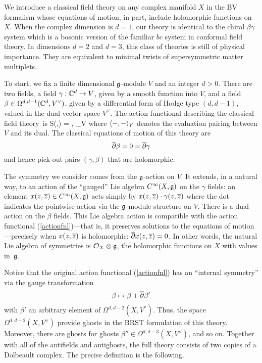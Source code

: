 We introduce a classical field theory on any complex manifold $X$ in the BV formalism whose equations of motion, in part, include holomorphic functions on $X$.
When the complex dimension is $d = 1$, our theory is identical to the chiral $\beta\gamma$ system which is a bosonic version of the familiar $bc$ system in conformal field theory. 
In dimensions $d=2$ and $d=3$, this class of theories is still of physical importance.
They are equivalent to minimal twists of supersymmetric matter multiplets. 

To start, we fix a finite dimensional $\mathfrak g$-module $V$ and an integer $d > 0$.
There are two fields, a field $\gamma : \mathbb C^d \to V$, given by a smooth function into $V$, and
a field $\beta \in \Omega^{d,d-1}(\mathbb C^d, V^\vee)$, 
given by a differential form of Hodge type $(d,d-1)$, valued in the dual vector space $V^\vee$. 
The action functional describing the classical field theory~is
\beqn\label{actionfnl}
S(\gamma,\beta) = \int \<\beta, \dbar\gamma\>_V
\eeqn
where $\langle-,-\rangle_V$ denotes the evaluation pairing between $V$ and its dual. 
The classical equations of motion of this theory are 
\[
\overline{\partial} \beta = 0 =\overline{\partial} \gamma
\]
and hence pick out pairs $(\gamma,\beta)$ that are holomorphic. 

The symmetry we consider comes from the $\mathfrak g$-action on $V$. 
It extends, in a natural way, to an action of the ``gauged'' Lie algebra $C^\infty(X, \mathfrak g)$ on the $\gamma$ fields: an element $x(z,\overline{z}) \in C^\infty(X,\mathfrak g)$ acts simply by $x(z,\overline{z}) \cdot \gamma(z,\overline{z})$ where the dot indicates the pointwise action via the $\mathfrak g$-module structure on $V$. 
There is a dual action on the $\beta$ fields.
This Lie algebra action is compatible with the action functional (\ref{actionfnl})---that is, it preserves solutions to the equations of motion---precisely when $x(z,\overline{z})$ is holomorphic: $\overline{\partial} x(z,\overline{z}) = 0$. 
In other words, the natural Lie algebra of symmetries is $\mathcal O_X \otimes \mathfrak g$, the holomorphic functions on $X$ with values in~$\mathfrak g$.

Notice that the original action functional (\ref{actionfnl}) has an ``internal symmetry'' via the gauge transformation
\[
\beta \mapsto \beta + \overline{\partial} \beta' 
\]
with $\beta'$ an arbitrary element of $\Omega^{d,d-2} (X, V^*)$. 
Thus, the space $\Omega^{d,d-2} (X, V^\vee)$ provide ghosts in the BRST formulation of this theory. 
Moreover, there are ghosts for ghosts $\beta'' \in \Omega^{d,d-3}(X , V^\vee)$, and so on.
Together with all of the antifields and antighosts, the full theory consists of two copies of a Dolbeault complex.
The precise definition is the following.

